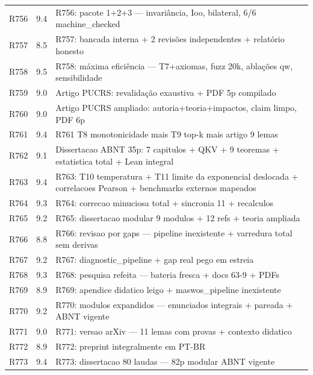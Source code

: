 \documentclass[12pt,openany,oneside,a4paper,brazil,chapter=TITLE]{abntex2}
\begin{document}
\begin{SingleSpacing}
\begin{longtable}{p{1.1cm}p{1.2cm}p{12.2cm}}
R756 & 9.4 & \parbox[t]{12cm}{\raggedright\footnotesize R756: pacote 1+2+3 — invariância, Ioo, bilateral, 6/6 machine\_checked} \\
R757 & 8.5 & \parbox[t]{12cm}{\raggedright\footnotesize R757: bancada interna + 2 revisões independentes + relatório honesto} \\
R758 & 9.5 & \parbox[t]{12cm}{\raggedright\footnotesize R758: máxima eficiência — T7+axiomas, fuzz 20k, ablações qw, sensibilidade} \\
R759 & 9.0 & \parbox[t]{12cm}{\raggedright\footnotesize Artigo PUCRS: revalidação exaustiva + PDF 5p compilado} \\
R760 & 9.0 & \parbox[t]{12cm}{\raggedright\footnotesize Artigo PUCRS ampliado: autoria+teoria+impactos, claim limpo, PDF 6p} \\
R761 & 9.4 & \parbox[t]{12cm}{\raggedright\footnotesize R761 T8 monotonicidade mais T9 top-k mais artigo 9 lemas} \\
R762 & 9.1 & \parbox[t]{12cm}{\raggedright\footnotesize Dissertacao ABNT 35p: 7 capitulos + QKV + 9 teoremas + estatistica total + Lean integral} \\
R763 & 9.4 & \parbox[t]{12cm}{\raggedright\footnotesize R763: T10 temperatura + T11 limite da exponencial deslocada + correlacoes Pearson + benchmarks externos mapeados} \\
R764 & 9.3 & \parbox[t]{12cm}{\raggedright\footnotesize R764: correcao minuciosa total + sincronia 11 + recalculos} \\
R765 & 9.2 & \parbox[t]{12cm}{\raggedright\footnotesize R765: dissertacao modular 9 modulos + 12 refs + teoria ampliada} \\
R766 & 8.8 & \parbox[t]{12cm}{\raggedright\footnotesize R766: revisao por gaps — pipeline inexistente + varredura total sem derivas} \\
R767 & 9.2 & \parbox[t]{12cm}{\raggedright\footnotesize R767: diagnostic\_pipeline + gap real pego em estreia} \\
R768 & 9.3 & \parbox[t]{12cm}{\raggedright\footnotesize R768: pesquisa refeita — bateria fresca + docs 63-9 + PDFs} \\
R769 & 8.9 & \parbox[t]{12cm}{\raggedright\footnotesize R769: apendice didatico leigo + maswos\_pipeline inexistente} \\
R770 & 9.2 & \parbox[t]{12cm}{\raggedright\footnotesize R770: modulos expandidos — enunciados integrais + pareada + ABNT vigente} \\
R771 & 9.0 & \parbox[t]{12cm}{\raggedright\footnotesize R771: versao arXiv — 11 lemas com provas + contexto didatico} \\
R772 & 8.9 & \parbox[t]{12cm}{\raggedright\footnotesize R772: preprint integralmente em PT-BR} \\
R773 & 9.4 & \parbox[t]{12cm}{\raggedright\footnotesize R773: dissertacao 80 laudas — 82p modular ABNT vigente} \\
\bottomrule
\end{longtable}
\noindent{}


\end{SingleSpacing}
\end{document}

